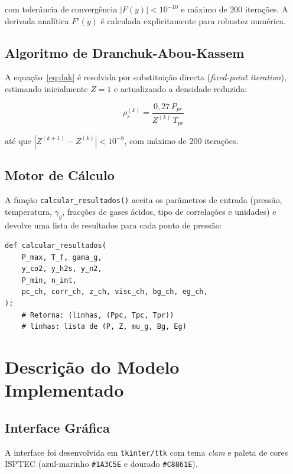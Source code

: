 \documentclass[12pt, a4paper]{article}
\begin{document}
com tolerância de convergência $|F(y)| < 10^{-10}$ e máximo de 200 iterações.
A derivada analítica $F'(y)$ é calculada explicitamente para robustez numérica.

\subsection{Algoritmo de Dranchuk-Abou-Kassem}

A equação~\eqref{eq:dak} é resolvida por substituição directa (\textit{fixed-point
iteration}), estimando inicialmente $Z = 1$ e actualizando a densidade reduzida:

\begin{equation}
  \rho_r^{(k)} = \frac{0{,}27\,P_{pr}}{Z^{(k)}\,T_{pr}}
\end{equation}

até que $|Z^{(k+1)} - Z^{(k)}| < 10^{-8}$, com máximo de 200 iterações.

\subsection{Motor de Cálculo}

A função \texttt{calcular\_resultados()} aceita os parâmetros de entrada
(pressão, temperatura, $\gamma_g$, fracções de gases ácidos, tipo de correlações
e unidades) e devolve uma lista de resultados para cada ponto de pressão:

\begin{lstlisting}[caption={Assinatura da função principal de cálculo}]
def calcular_resultados(
    P_max, T_f, gama_g,
    y_co2, y_h2s, y_n2,
    P_min, n_int,
    pc_ch, corr_ch, z_ch, visc_ch, bg_ch, eg_ch,
):
    # Retorna: (linhas, (Ppc, Tpc, Tpr))
    # linhas: lista de (P, Z, mu_g, Bg, Eg)
\end{lstlisting}

\section{Descrição do Modelo Implementado}

\subsection{Interface Gráfica}

A interface foi desenvolvida em \texttt{tkinter/ttk} com tema \textit{clam} e paleta
de cores ISPTEC (azul-marinho \texttt{\#1A3C5E} e dourado \texttt{\#C8861E}).
\end{document}
